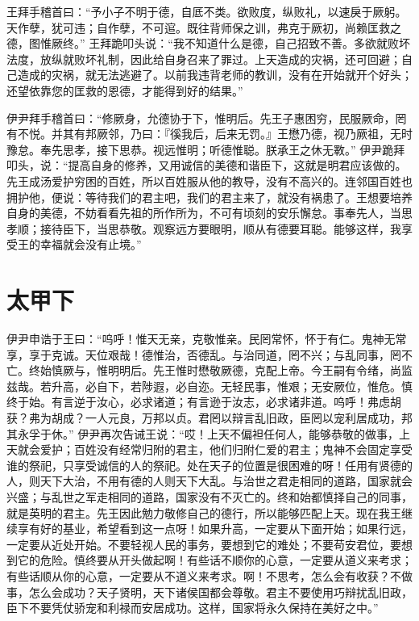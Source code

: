 \documentclass[12pt,UTF8]{ctexbook}
\begin{document}
王拜手稽首曰：“予小子不明于德，自厎不类。欲败度，纵败礼，以速戾于厥躬。天作孽，犹可违；自作孽，不可逭。既往背师保之训，弗克于厥初，尚赖匡救之德，图惟厥终。”
王拜跪叩头说：“我不知道什么是德，自己招致不善。多欲就败坏法度，放纵就败坏礼制，因此给自身召来了罪过。上天造成的灾祸，还可回避；自己造成的灾祸，就无法逃避了。以前我违背老师的教训，没有在开始就开个好头；还望依靠您的匡救的恩德，才能得到好的结果。”

伊尹拜手稽首曰：“修厥身，允德协于下，惟明后。先王子惠困穷，民服厥命，罔有不悦。并其有邦厥邻，乃曰：『徯我后，后来无罚。』王懋乃德，视乃厥祖，无时豫怠。奉先思孝，接下思恭。视远惟明；听德惟聪。朕承王之休无斁。”
伊尹跪拜叩头，说：“提高自身的修养，又用诚信的美德和谐臣下，这就是明君应该做的。先王成汤爱护穷困的百姓，所以百姓服从他的教导，没有不高兴的。连邻国百姓也拥护他，便说：等待我们的君主吧，我们的君主来了，就没有祸患了。王想要培养自身的美德，不妨看看先祖的所作所为，不可有顷刻的安乐懈怠。事奉先人，当思孝顺；接待臣下，当思恭敬。观察远方要眼明，顺从有德要耳聪。能够这样，我享受王的幸福就会没有止境。”

\chapter{太甲下}

伊尹申诰于王曰：“呜呼！惟天无亲，克敬惟亲。民罔常怀，怀于有仁。鬼神无常享，享于克诚。天位艰哉！德惟治，否德乱。与治同道，罔不兴；与乱同事，罔不亡。终始慎厥与，惟明明后。先王惟时懋敬厥德，克配上帝。今王嗣有令绪，尚监兹哉。若升高，必自下，若陟遐，必自迩。无轻民事，惟艰；无安厥位，惟危。慎终于始。有言逆于汝心，必求诸道；有言逊于汝志，必求诸非道。呜呼！弗虑胡获？弗为胡成？一人元良，万邦以贞。君罔以辩言乱旧政，臣罔以宠利居成功，邦其永孚于休。”
伊尹再次告诫王说：“哎！上天不偏袒任何人，能够恭敬的做事，上天就会爱护；百姓没有经常归附的君主，他们归附仁爱的君主；鬼神不会固定享受谁的祭祀，只享受诚信的人的祭祀。处在天子的位置是很困难的呀！任用有贤德的人，则天下大治，不用有德的人则天下大乱。与治世之君走相同的道路，国家就会兴盛；与乱世之军走相同的道路，国家没有不灭亡的。终和始都慎择自己的同事，就是英明的君主。先王因此勉力敬修自己的德行，所以能够匹配上天。现在我王继续享有好的基业，希望看到这一点呀！如果升高，一定要从下面开始；如果行远，一定要从近处开始。不要轻视人民的事务，要想到它的难处；不要苟安君位，要想到它的危险。慎终要从开头做起啊！有些话不顺你的心意，一定要从道义来考求；有些话顺从你的心意，一定要从不道义来考求。啊！不思考，怎么会有收获？不做事，怎么会成功？天子贤明，天下诸侯国都会尊敬。君主不要使用巧辩扰乱旧政，臣下不要凭仗骄宠和利禄而安居成功。这样，国家将永久保持在美好之中。”
\end{document}
